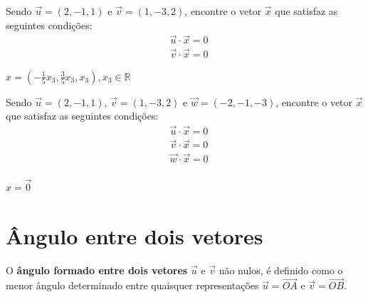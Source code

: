 \begin{exer}
  Sendo $\vec{u}=(2,-1,1)$ e $\vec{v}=(1,-3,2)$, encontre o vetor $\vec{x}$ que satisfaz as seguintes condições:
  \begin{align}
    &\vec{u}\cdot\vec{x} = 0\\
    &\vec{v}\cdot\vec{x} = 0
  \end{align}
\end{exer}
\begin{resp}
  $\displaystyle x = \left(-\frac{1}{5}x_3, \frac{3}{5}x_3, x_3\right), x_3\in\mathbb{R}$
\end{resp}

\begin{exer}
  Sendo $\vec{u}=(2,-1,1)$, $\vec{v}=(1,-3,2)$ e $\vec{w}=(-2,-1,-3)$, encontre o vetor $\vec{x}$ que satisfaz as seguintes condições:
  \begin{align}
    &\vec{u}\cdot\vec{x} = 0\\
    &\vec{v}\cdot\vec{x} = 0\\
    &\vec{w}\cdot\vec{x} = 0\\
  \end{align}
\end{exer}
\begin{resp}
  $x = \vec{0}$
\end{resp}

\emconstrucao

\section{Ângulo entre dois vetores}\label{cap_prodesc_sec_angulo}

O {\bf ângulo formado entre dois vetores} $\vec{u}$ e $\vec{v}$ não nulos, é definido como o menor ângulo determinado entre quaisquer representações $\vec{u} = \overrightarrow{OA}$ e $\vec{v} = \overrightarrow{OB}$.

